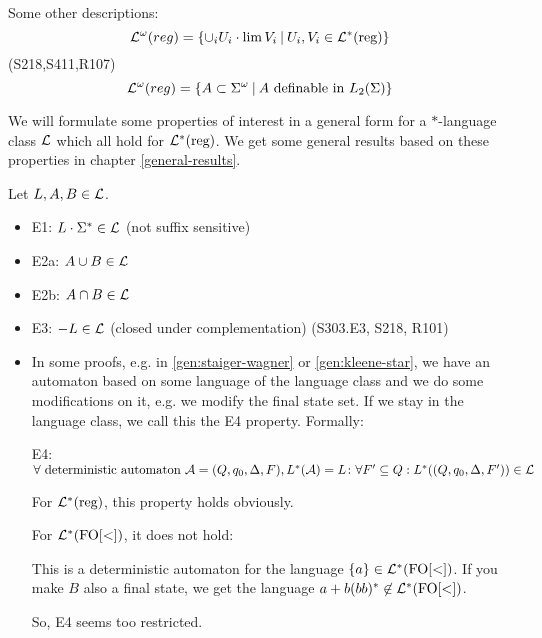 Some other descriptions:
\[ \Lang^\omega(reg) = \Set{ \cup_i U_i \cdot \lim V_i }{ U_i, V_i \in \Langreg } \]
(S218,S411,R107)
\[ \Lang^\omega(reg) = \Set{A \subset \Sigma^\omega}{A \text{ definable in } L_2(\Sigma)} \]

We will formulate some properties of interest in a general form for a $*$-language class $\mathcal{L}$ which all hold for $\mathcal{L}^*(\text{reg})$. We get some general results based on these properties in chapter \ref{general-results}.

Let $L,A,B \in \mathcal{L}$.
\begin{itemize}
\item E1: $L \cdot \Sigma^* \in \mathcal{L}$ (not suffix sensitive)
\item E2a: $A \cup B \in \mathcal{L}$
\item E2b: $A \cap B \in \mathcal{L}$
\item E3: $- L \in \mathcal{L}$ (closed under complementation) (S303.E3, S218, R101)

\item
In some proofs, e.g. in \ref{gen:staiger-wagner} or \ref{gen:kleene-star}, we have an automaton based on some language of the language class and we do some modifications on it, e.g. we modify the final state set. If we stay in the language class, we call this the E4 property. Formally:

E4: $\forall \text{ deterministic automaton } \mathcal{A} = (Q,q_0,\Delta,F), L^*(\mathcal{A}) = L \colon \forall F' \subseteq Q: L^*((Q,q_0,\Delta,F')) \in \mathcal{L}$

For $\mathcal{L}^*(\text{reg})$, this property holds obviously.

For $\mathcal{L}^*(\mathrm{FO[<]})$, it does not hold:

  
This is a deterministic automaton for the language $\Set{a} \in \Lang^*(\mathrm{FO[<]})$. If you make $B$ also a final state, we get the language $a + b(bb)^* \not\in \mathcal{L}^*(\mathrm{FO[<]})$.

So, E4 seems too restricted.


\end{itemize}
